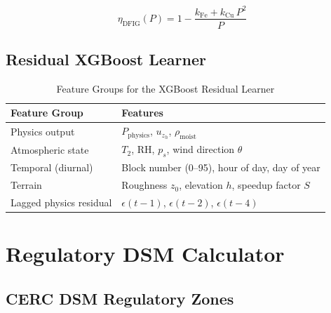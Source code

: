 \documentclass[12pt,a4paper]{report}
\begin{document}
\begin{equation}
  \eta_{\text{DFIG}}(P) = 1 - \frac{k_{\text{Fe}} + k_{\text{Cu}}\,P^2}{P}
\end{equation}

\section{Residual XGBoost Learner}

\begin{table}[H]
  \centering
  \caption{Feature Groups for the XGBoost Residual Learner}
  \label{tab:features}
  \begin{tabular}{ll}
    \toprule
    \textbf{Feature Group} & \textbf{Features} \\
    \midrule
    Physics output          & $P_{\text{physics}}$, $u_{z_h}$, $\rho_{\text{moist}}$ \\
    Atmospheric state       & $T_2$, $\text{RH}$, $p_s$, wind direction $\theta$ \\
    Temporal (diurnal)      & Block number (0--95), hour of day, day of year \\
    Terrain                 & Roughness $z_0$, elevation $h$, speedup factor $S$ \\
    Lagged physics residual & $\epsilon(t-1)$, $\epsilon(t-2)$, $\epsilon(t-4)$ \\
    \bottomrule
  \end{tabular}
\end{table}

\chapter{Regulatory DSM Calculator}
\label{ch:dsm}

\section{CERC DSM Regulatory Zones}
\end{document}
